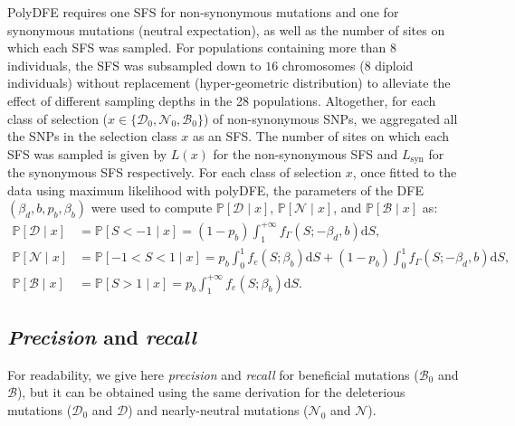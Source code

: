 \documentclass[12pt]{article}
\newcommand{\der}{\text{d}}
\newcommand{\proba}{\mathbb{P}}
\newcommand{\SphyDel}{\mathcal{D}_0}
\newcommand{\SphyNeu}{\mathcal{N}_0}
\newcommand{\SphyBen}{\mathcal{B}_0}
\newcommand{\Sphyclass}{x}
\newcommand{\given}{\mid}
\newcommand{\Spop}{S}
\newcommand{\SpopDel}{\mathcal{D}}
\newcommand{\SpopNeu}{\mathcal{N}}
\newcommand{\SpopBen}{\mathcal{B}}
\newcommand{\AdvMean}{\beta_b}
\newcommand{\DelMean}{\beta_d}
\begin{document}
    PolyDFE requires one SFS for non-synonymous mutations and one for synonymous mutations (neutral expectation), as well as the number of sites on which each SFS was sampled.
    For populations containing more than $8$ individuals, the SFS was subsampled down to $16$ chromosomes ($8$ diploid individuals) without replacement (hyper-geometric distribution) to alleviate the effect of different sampling depths in the 28 populations.
    Altogether, for each class of selection ($\Sphyclass \in \{\SphyDel, \SphyNeu, \SphyBen \}$) of non-synonymous SNPs, we aggregated all the SNPs in the selection class $\Sphyclass$ as an SFS.
    The number of sites on which each SFS was sampled is given by $L(\Sphyclass)$ for the non-synonymous SFS and $L_{\text{syn}}$ for the synonymous SFS respectively.
    For each class of selection $\Sphyclass$, once fitted to the data using maximum likelihood with polyDFE, the parameters of the DFE $\left( \DelMean , b, p_b, \AdvMean \right)$ were used to compute $\proba [ \SpopDel \given  \Sphyclass] $, $\proba [ \SpopNeu \given \Sphyclass]$, and $\proba [ \SpopBen \given \Sphyclass]$ as:
    \begin{align}
        \proba [ \SpopDel \given  \Sphyclass] &= \proba [ \Spop < -1 \given \Sphyclass ] = \left( 1 - p_b \right) \int_{1}^{+\infty} f_{\Gamma}(\Spop; -\DelMean, b) \der \Spop, \label{eq:polyProbaDel} \\
        \proba [ \SpopNeu \given \Sphyclass] &= \proba [ -1 < \Spop < 1 \given \Sphyclass ] = p_b \int_{0}^{1} f_{e}(\Spop; \AdvMean) \der \Spop + \left( 1 - p_b \right) \int_{0}^{1} f_{\Gamma}(\Spop; -\DelMean, b) \der \Spop, \\
        \proba [ \SpopBen \given \Sphyclass] &= \proba [ \Spop > 1 \given \Sphyclass] = p_b \int_{1}^{+\infty} f_{e}(\Spop; \AdvMean) \der \Spop. \label{eq:polyProbaAdv}
    \end{align}


    \subsection{\textit{Precision} and \textit{recall}}
    \label{subsec:precisison_recall}
    For readability, we give here \textit{precision} and \textit{recall} for beneficial mutations ($\SphyBen$ and $\SpopBen$), but it can be obtained using the same derivation for the deleterious mutations ($\SphyDel$ and $\SpopDel$) and nearly-neutral mutations ($\SphyNeu$ and $\SpopNeu$).
\end{document}
